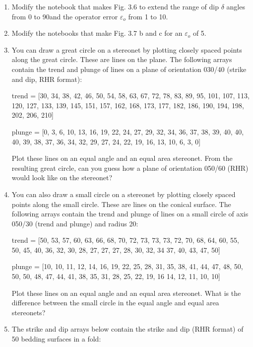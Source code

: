 \documentclass[a4paper , 12pt]{book}
\begin{document}
\begin{enumerate}
  \item Modify the notebook that makes Fig. 3.6 to extend the range of dip $\delta$ angles from 0 to 90\degree and the operator error $\varepsilon_o$ from 1 to 10\degree.
  
  \item Modify the notebooks that make Fig. 3.7 b and c for an $\varepsilon_o$ of 5\degree.
  
  \item You can draw a great circle on a stereonet by plotting closely spaced points along the great circle. These are lines on the plane. The following arrays contain the trend and plunge of lines on a plane of orientation 030/40 (strike and dip, RHR format):
  
  trend = [30, 34, 38, 42, 46, 50, 54, 58, 63, 67, 72, 78, 83, 89, 95, 101, 107, 113, 120, 127, 133, 139, 145, 151, 157, 162, 168, 173, 177, 182, 186, 190, 194, 198, 202, 206, 210]
  
  plunge = [0, 3, 6, 10, 13, 16, 19, 22, 24, 27, 29, 32, 34, 36, 37, 38, 39, 40, 40, 40, 39, 38, 37, 36, 34, 32, 29, 27, 24, 22, 19, 16, 13, 10, 6, 3, 0]
  
  Plot these lines on an equal angle and an equal area stereonet. From the resulting great circle, can you guess how a plane of orientation 050/60 (RHR) would look like on the stereonet? 
  
  \item You can also draw a small circle on a stereonet by plotting closely spaced points along the small circle. These are lines on the conical surface. The following arrays contain the trend and plunge of lines on a small circle of axis 050/30 (trend and plunge) and radius 20\degree:
  
  trend = [50, 53, 57, 60, 63, 66, 68, 70, 72, 73, 73, 73, 72, 70, 68, 64, 60, 55, 50, 45, 40, 36, 32, 30, 28, 27, 27, 27, 28, 30, 32, 34 37, 40, 43, 47, 50]
  
  plunge = [10, 10, 11, 12, 14, 16, 19, 22, 25, 28, 31, 35, 38, 41, 44, 47, 48, 50, 50, 50, 48, 47, 44, 41, 38, 35, 31, 28, 25, 22, 19, 16 14, 12, 11, 10, 10]
  
  Plot these lines on an equal angle and an equal area stereonet. What is the difference between the small circle in the equal angle and equal area stereonets?
  
  \item The strike and dip arrays below contain the strike and dip (RHR format) of 50 bedding surfaces in a fold:
  

\end{enumerate}
\end{document}
